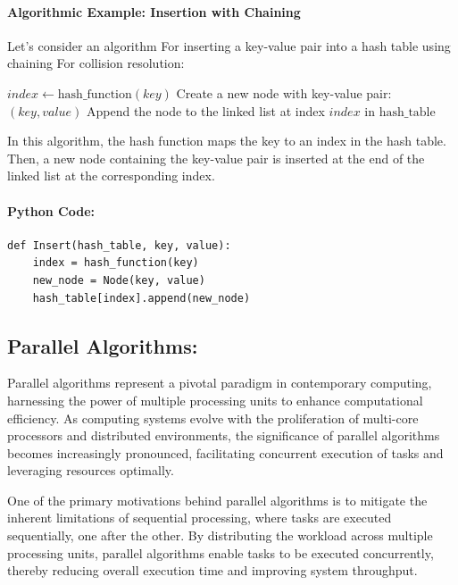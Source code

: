 \documentclass[12pt]{book} %
\begin{document}
\paragraph{Algorithmic Example: Insertion with Chaining}

Let's consider an algorithm For inserting a key-value pair into a hash table using chaining For collision resolution:

\begin{algorithm}
\caption{Insertion with Chaining}
\begin{algorithmic}[1]
    \State $index \gets \text{hash\_function}(key)$
    \State Create a new node with key-value pair: $(key, value)$
    \State Append the node to the linked list at index $index$ in $\text{hash\_table}$
\EndFunction
\end{algorithmic}
\end{algorithm}

In this algorithm, the hash function maps the key to an index in the hash table. Then, a new node containing the key-value pair is inserted at the end of the linked list at the corresponding index.
\paragraph{Python Code: }
\begin{verbatim}
def Insert(hash_table, key, value):
    index = hash_function(key)
    new_node = Node(key, value)
    hash_table[index].append(new_node)
\end{verbatim}


\subsection{Parallel Algorithms:}

Parallel algorithms represent a pivotal paradigm in contemporary computing, harnessing the power of multiple processing units to enhance computational efficiency. As computing systems evolve with the proliferation of multi-core processors and distributed environments, the significance of parallel algorithms becomes increasingly pronounced, facilitating concurrent execution of tasks and leveraging resources optimally.

One of the primary motivations behind parallel algorithms is to mitigate the inherent limitations of sequential processing, where tasks are executed sequentially, one after the other. By distributing the workload across multiple processing units, parallel algorithms enable tasks to be executed concurrently, thereby reducing overall execution time and improving system throughput.
\end{document}
